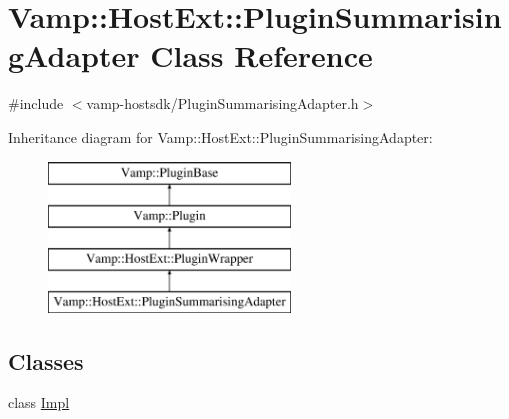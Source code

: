 \hypertarget{class_vamp_1_1_host_ext_1_1_plugin_summarising_adapter}{}\section{Vamp\+:\+:Host\+Ext\+:\+:Plugin\+Summarising\+Adapter Class Reference}
\label{class_vamp_1_1_host_ext_1_1_plugin_summarising_adapter}


{\ttfamily \#include $<$vamp-\/hostsdk/\+Plugin\+Summarising\+Adapter.\+h$>$}

Inheritance diagram for Vamp\+:\+:Host\+Ext\+:\+:Plugin\+Summarising\+Adapter\+:\begin{figure}[H]
\begin{center}
\leavevmode
\includegraphics[height=4.000000cm]{class_vamp_1_1_host_ext_1_1_plugin_summarising_adapter}
\end{center}
\end{figure}
\subsection*{Classes}
\begin{DoxyCompactItemize}
\item 
class \hyperlink{class_vamp_1_1_host_ext_1_1_plugin_summarising_adapter_1_1_impl}{Impl}
\end{DoxyCompactItemize}
